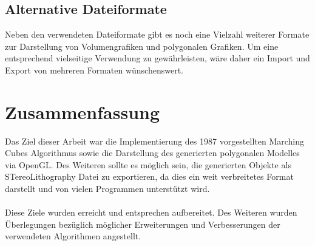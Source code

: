 \subsection{Alternative Dateiformate}
Neben den verwendeten Dateiformate gibt es noch eine Vielzahl weiterer Formate zur Darstellung von Volumengrafiken und polygonalen Grafiken. Um eine entsprechend vielseitige Verwendung zu gewährleisten, wäre daher ein Import und Export von mehreren Formaten wünschenswert.

\section{Zusammenfassung}
Das Ziel dieser Arbeit war die Implementierung des 1987 vorgestellten Marching Cubes Algorithmus sowie die Darstellung des generierten polygonalen Modelles via OpenGL. Des Weiteren sollte es möglich sein, die generierten Objekte als STereoLithography Datei zu exportieren, da dies ein weit verbreitetes Format darstellt und von vielen Programmen unterstützt wird.\\
\\
Diese Ziele wurden erreicht und entsprechen aufbereitet. Des Weiteren wurden Überlegungen bezüglich möglicher Erweiterungen und Verbesserungen der verwendeten Algorithmen angestellt. 